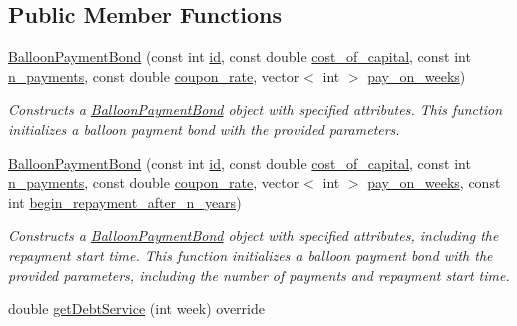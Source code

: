 \subsection*{Public Member Functions}
\begin{DoxyCompactItemize}
\item 
\mbox{\hyperlink{classBalloonPaymentBond_a03b25124896e67f851a35721c37705fe}{Balloon\+Payment\+Bond}} (const int \mbox{\hyperlink{classBond_a7f75bcafbc16676ad6dbafbf40afae4a}{id}}, const double \mbox{\hyperlink{classBond_ad98df7d28b398e620286f95ee085439b}{cost\+\_\+of\+\_\+capital}}, const int \mbox{\hyperlink{classBond_a4a227b6de2eeada118d82ab1633b1db8}{n\+\_\+payments}}, const double \mbox{\hyperlink{classBond_a5f66785534e24caa43d9f730130a6463}{coupon\+\_\+rate}}, vector$<$ int $>$ \mbox{\hyperlink{classBond_ae8dd46fcbf95c993460ffe4ea1f52739}{pay\+\_\+on\+\_\+weeks}})
\begin{DoxyCompactList}\small\item\em Constructs a \mbox{\hyperlink{classBalloonPaymentBond}{Balloon\+Payment\+Bond}} object with specified attributes. This function initializes a balloon payment bond with the provided parameters. \end{DoxyCompactList}\item 
\mbox{\hyperlink{classBalloonPaymentBond_afc8bb53b6642dac9811414b447279e5b}{Balloon\+Payment\+Bond}} (const int \mbox{\hyperlink{classBond_a7f75bcafbc16676ad6dbafbf40afae4a}{id}}, const double \mbox{\hyperlink{classBond_ad98df7d28b398e620286f95ee085439b}{cost\+\_\+of\+\_\+capital}}, const int \mbox{\hyperlink{classBond_a4a227b6de2eeada118d82ab1633b1db8}{n\+\_\+payments}}, const double \mbox{\hyperlink{classBond_a5f66785534e24caa43d9f730130a6463}{coupon\+\_\+rate}}, vector$<$ int $>$ \mbox{\hyperlink{classBond_ae8dd46fcbf95c993460ffe4ea1f52739}{pay\+\_\+on\+\_\+weeks}}, const int \mbox{\hyperlink{classBalloonPaymentBond_a7e1e064643021755eda4873b0c98e434}{begin\+\_\+repayment\+\_\+after\+\_\+n\+\_\+years}})
\begin{DoxyCompactList}\small\item\em Constructs a \mbox{\hyperlink{classBalloonPaymentBond}{Balloon\+Payment\+Bond}} object with specified attributes, including the repayment start time. This function initializes a balloon payment bond with the provided parameters, including the number of payments and repayment start time. \end{DoxyCompactList}\item 
double \mbox{\hyperlink{classBalloonPaymentBond_a8648a2ae688f90a3b2e6689711c22b9d}{get\+Debt\+Service}} (int week) override

\end{DoxyCompactItemize}
